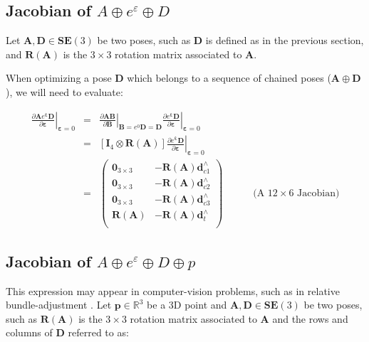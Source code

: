 \documentclass[a4paper,11pt]{report}
\newcommand{\E}{{\bm{\varepsilon}}}
\newcommand{\A}{{\mathbf{A}}}
\newcommand{\B}{{\mathbf{B}}}
\newcommand{\D}{{\mathbf{D}}}
\newcommand{\I}{{\mathbf{I}}}
\newcommand{\hatop}[1]{#1^\wedge}
\begin{document}



\subsection{Jacobian of $A \oplus e^\varepsilon \oplus D$}

Let $\A,\D \in \mathbf{SE}(3)$ be two poses, such as
$\D$ is defined as in the previous section, and $\mathbf{R}(\A)$ is
the $3\times 3$ rotation matrix associated to $\A$.

When optimizing a pose $\D$ which belongs to a sequence of chained poses
($\A \oplus \D$), we will need to evaluate:

\begin{eqnarray}
\label{eq:jacob.AeD}
\left. \frac{\partial \A e^\E \D}{\partial \E} \right|_{\E = 0}
&=&
\left. \frac{\partial \A \B}{\partial \B} \right|_{\B= e^0 \D = \D}
\left. \frac{\partial e^\E \mathbf{D}}{\partial \E} \right|_{\E = 0}
\\
&=&
\left[ \I_4 \otimes \mathbf{R}(\A) \right]
\left. \frac{\partial e^\E \mathbf{D}}{\partial \E} \right|_{\E = 0}
\\
&=&
\left(
\begin{array}{cc}
 \mathbf{0}_{3\times 3}  & -\mathbf{R}(\A) \hatop{\mathbf{d}}_{c1} \\
 \mathbf{0}_{3\times 3}  & -\mathbf{R}(\A) \hatop{\mathbf{d}}_{c2} \\
 \mathbf{0}_{3\times 3}  & -\mathbf{R}(\A) \hatop{\mathbf{d}}_{c3} \\
 \mathbf{R}(\A)          & -\mathbf{R}(\A) \hatop{\mathbf{d}}_{t} \\
\end{array}
\right)
\quad\quad\quad \text{(A $12 \times 6$ Jacobian)}
\end{eqnarray}


\subsection{Jacobian of $A \oplus e^\varepsilon \oplus D \oplus p$}
\label{eq:jacob_A_e_D_p}

This expression may appear in computer-vision problems,
such as in relative bundle-adjustment \cite{sibley2009rba}.
Let $\mathbf{p} \in \mathbb{R}^3$ be a 3D point
and $\A,\D \in \mathbf{SE}(3)$ be two poses, such as
$\mathbf{R}(\A)$ is the $3\times 3$ rotation matrix associated to $\A$ and
the rows and columns of $\D$ referred to as:
\end{document}
